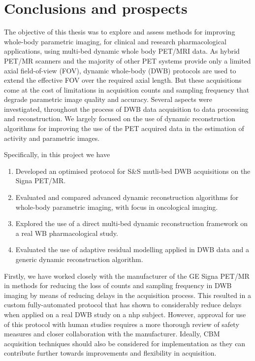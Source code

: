 \chapter*{Conclusions and prospects}
The objective of this thesis was to explore and assess methods for improving whole-body parametric imaging, for clinical and research pharmacological applications, using multi-bed dynamic whole body PET/MRI data.
As hybrid PET/MR scanners and the majority of other PET systems provide only a limited axial field-of-view (FOV), dynamic whole-body (DWB) protocols are used to extend the effective FOV over the required axial length. But these acquisitions come at the cost of limitations in acquisition counts and sampling frequency that degrade parametric image quality and accuracy.
Several aspects were investigated, throughout the process of DWB data acquisition to data processing and reconstruction. We largely focused on the use of dynamic reconstruction algorithms for improving the use of the PET acquired data in the estimation of activity and parametric images.

Specifically, in this project we have
\begin{enumerate}
\item Developed an optimised protocol for S\&S mutli-bed DWB acquisitions on the Signa PET/MR.
\item Evaluated and compared advanced dynamic reconstruction algorithms for whole-body parametric imaging, with focus in oncological imaging.
\item Explored the use of a direct multi-bed dynamic reconstruction framework on a real WB pharmacological study.
\item Evaluated the use of adaptive residual modelling applied in DWB data and a generic dynamic reconstruction algorithm.
\end{enumerate}

Firstly, we have worked closely with the manufacturer of the GE Signa PET/MR in methods for reducing the loss of counts and sampling frequency in DWB imaging by means of reducing delays in the acquisition process. This resulted in a custom fully-automated protocol that has shown to considerably reduce delays when applied on a real DWB study on a \gls{nhp} subject. However, approval for use of this protocol with human studies requires a more thorough review of safety measures and closer collaboration with the manufacturer. Ideally, CBM acquisition techniques should also be considered for implementation as they can contribute further towards improvements and flexibility in acquisition. 

